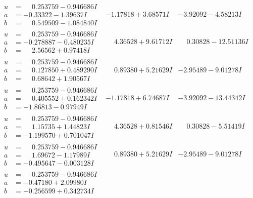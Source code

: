 \documentclass[1p]{elsarticle_modified}
\theoremstyle{definition}
\begin{document}
$$\begin{array}{c|c|c}
\begin{aligned}
u &= \phantom{-}0.253759 - 0.946686 I \\
a &= -0.33322 - 1.39637 I \\
b &= \phantom{-}0.549509 - 1.084840 I\end{aligned}
 & -1.17818 + 3.68571 I & -3.92092 - 4.58213 I \\ \hline\begin{aligned}
u &= \phantom{-}0.253759 - 0.946686 I \\
a &= -0.278887 - 0.480235 I \\
b &= \phantom{-}2.56562 + 0.97418 I\end{aligned}
 & \phantom{-}4.36528 + 9.61712 I & \phantom{-}0.30828 - 12.51136 I \\ \hline\begin{aligned}
u &= \phantom{-}0.253759 - 0.946686 I \\
a &= \phantom{-}0.127850 + 0.489290 I \\
b &= \phantom{-}0.68642 + 1.90567 I\end{aligned}
 & \phantom{-}0.89380 + 5.21629 I & -2.95489 - 9.01278 I \\ \hline\begin{aligned}
u &= \phantom{-}0.253759 - 0.946686 I \\
a &= \phantom{-}0.405552 + 0.162342 I \\
b &= -1.86813 - 0.97949 I\end{aligned}
 & -1.17818 + 6.74687 I & -3.92092 - 13.44342 I \\ \hline\begin{aligned}
u &= \phantom{-}0.253759 - 0.946686 I \\
a &= \phantom{-}1.15735 + 1.44823 I \\
b &= -1.199570 + 0.701047 I\end{aligned}
 & \phantom{-}4.36528 + 0.81546 I & \phantom{-}0.30828 - 5.51419 I \\ \hline\begin{aligned}
u &= \phantom{-}0.253759 - 0.946686 I \\
a &= \phantom{-}1.69672 - 1.17989 I \\
b &= -0.495647 - 0.003128 I\end{aligned}
 & \phantom{-}0.89380 + 5.21629 I & -2.95489 - 9.01278 I \\ \hline\begin{aligned}
u &= \phantom{-}0.253759 - 0.946686 I \\
a &= -0.47180 + 2.09980 I \\
b &= -0.256599 + 0.342734 I\end{aligned}

\end{array}$$
\end{document}
